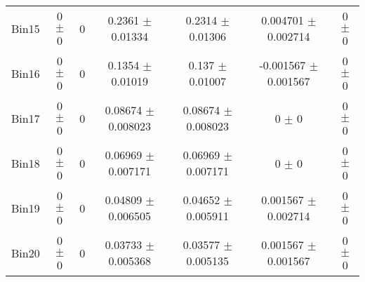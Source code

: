 \begin{tabular}{@{\extracolsep{4pt}}lcccccc@{}}
     Bin15 & 0 $\pm$ 0 & 0 & 0.2361 $\pm$ 0.01334 & 0.2314 $\pm$ 0.01306 & 0.004701 $\pm$ 0.002714 & 0 $\pm$ 0 \\ 
     Bin16 & 0 $\pm$ 0 & 0 & 0.1354 $\pm$ 0.01019 & 0.137 $\pm$ 0.01007 & -0.001567 $\pm$ 0.001567 & 0 $\pm$ 0 \\ 
     Bin17 & 0 $\pm$ 0 & 0 & 0.08674 $\pm$ 0.008023 & 0.08674 $\pm$ 0.008023 & 0 $\pm$ 0 & 0 $\pm$ 0 \\ 
     Bin18 & 0 $\pm$ 0 & 0 & 0.06969 $\pm$ 0.007171 & 0.06969 $\pm$ 0.007171 & 0 $\pm$ 0 & 0 $\pm$ 0 \\ 
     Bin19 & 0 $\pm$ 0 & 0 & 0.04809 $\pm$ 0.006505 & 0.04652 $\pm$ 0.005911 & 0.001567 $\pm$ 0.002714 & 0 $\pm$ 0 \\ 
     Bin20 & 0 $\pm$ 0 & 0 & 0.03733 $\pm$ 0.005368 & 0.03577 $\pm$ 0.005135 & 0.001567 $\pm$ 0.001567 & 0 $\pm$ 0 \\ 
\hline\hline
  \end{tabular}

